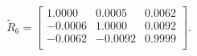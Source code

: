 \begin{equation*}
\widetilde{R}_{6} = 
\begin{bmatrix}
  1.0000 &   0.0005 &   0.0062 \\
 -0.0006 &   1.0000 &   0.0092 \\
 -0.0062 &  -0.0092 &   0.9999 \\
\end{bmatrix}.
\end{equation*}
